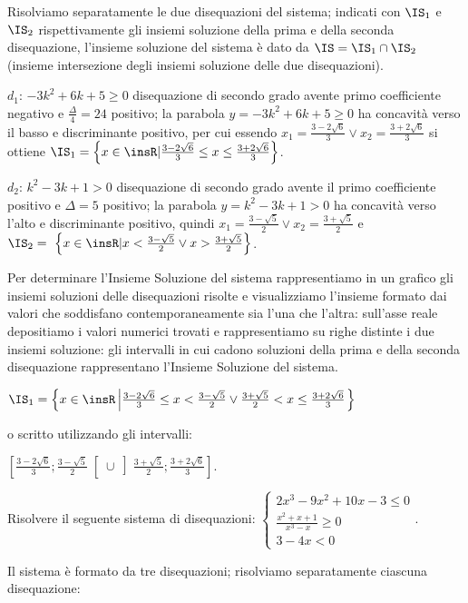 Risolviamo separatamente le due disequazioni del sistema; indicati con $\IS_1$ e 
$\IS_2$ rispettivamente gli insiemi soluzione della prima e della seconda 
disequazione, l'insieme soluzione del sistema è dato da $\IS=\IS_1\cap \IS_2$ 
(insieme intersezione degli insiemi soluzione delle due disequazioni).
\begin{itemize*}
\item $d_1$: $-3k^2+6k+5\ge 0$ disequazione di secondo grado avente primo 
coefficiente negativo e $\frac{\Delta } 4=24$ positivo; la parabola 
$y=-3k^2+6k+5\ge 0$ ha concavità verso il basso e discriminante positivo, per 
cui essendo $x_1=\frac{3-2\sqrt 6} 3\vee x_2=\frac{3+2\sqrt 6} 3$ si ottiene 
$\IS_1=\left\{x\in \insR | \frac{3-2\sqrt 6} 3\le x\le \frac{3+2\sqrt 6} 
3\right\}$.
\item $d_2$: $k^2-3k+1>0$ disequazione di secondo grado avente il primo 
coefficiente positivo e $\Delta =5$ positivo; la parabola $y=k^2-3k+1>0$ ha 
concavità verso l'alto e discriminante positivo, quindi $x_1=\frac{3-\sqrt 5} 
2\vee x_2=\frac{3+\sqrt 5} 2$ e
$\IS_2=~\left\{x\in \insR | x<\frac{3-\sqrt 5} 2\vee x>\frac{3+\sqrt 5} 
2\right\}$.
\end{itemize*}
Per determinare l'Insieme Soluzione del sistema rappresentiamo in un grafico gli 
insiemi soluzioni delle disequazioni risolte e visualizziamo l'insieme formato 
dai valori che soddisfano contemporaneamente sia l'una che l'altra: sull'asse 
reale depositiamo i valori numerici trovati e rappresentiamo su righe distinte i 
due insiemi soluzione: gli intervalli in cui cadono soluzioni della prima e 
della seconda disequazione rappresentano l'Insieme Soluzione del sistema.
\begin{center}
 
\end{center}

$\IS_1=\left\{x\in \insR\left|\frac{3-2\sqrt 6} 3\le x<\frac{3-\sqrt 5} 2\vee 
\frac{3+\sqrt 5} 2<x\le \frac{3+2\sqrt 6} 3\right.\right\}$

o scritto utilizzando gli intervalli: 

$\left.\left[\frac{3-2\sqrt 6} 3;\frac{3-\sqrt 5} 
2\right.\right[ \cup \left.\left]\frac{3+\sqrt 5} 2;\frac{3+2\sqrt 6} 
3\right.\right]$.

\begin{problema}
Risolvere il seguente sistema di disequazioni: $ 
\left\{\begin{array}{l}2x^3-9x^2+10x-3\le 0\\ \frac{x^2+x+1}{\ x^3-x}\ge 0 
\\3-4x<0 \end{array}\right.$.
\end{problema}
Il sistema è formato da tre disequazioni; risolviamo separatamente ciascuna 
disequazione:

